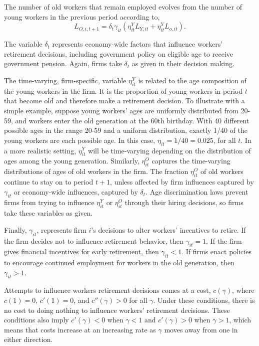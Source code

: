 \documentclass[11pt]{article}
\newcommand{\beq}{\begin{equation}}
\newcommand{\eeq}{\end{equation}}
\begin{document}
The number of old workers that remain employed evolves from the number of young workers in the previous period according to,
\beq \label{eq:gen} L_{O,i,t+1} = \delta_t \gamma_{it} \left( \eta^Y_{it}  L_{Y,it} + \eta^Y_{it} L_{o,it} \right). \eeq

The variable $\delta_t$ represents economy-wide factors that influence workers' retirement decisions, including government policy on eligible age to receive government pension. Again, firms take $\delta_t$ as given in their decision making.

The time-varying, firm-specific, variable $\eta^Y_{it}$ is related to the age composition of the young workers in the firm. It is the proportion of young workers in period $t$ that become old and therefore make a retirement decision. To illustrate with a simple example, suppose young workers' ages are uniformly distributed from 20-59, and workers enter the old generation at the 60th birthday. With 40 different possible ages in the range 20-59 and a uniform distribution, exactly 1/40 of the young workers are each possible age. In this case, $\eta_{it} = 1 / 40 = 0.025$, for all $t$. In a more realistic setting, $\eta_{it}^Y$ will be time-varying depending on the distribution of ages among the young generation. Similarly, $\eta_{it}^O$ captures the time-varying distributions of ages of old workers in the firm. The fraction $\eta_{it}^O$ of old workers continue to stay on to period $t+1$, unless affected by firm influences captured by $\gamma_{it}$ or economy-wide influences, captured by $\delta_{t}$. Age discrimination laws prevent firms from trying to influence $\eta^Y_{it}$ or $\eta^O_{it}$ through their hiring decisions, so firms take these variables as given.

Finally, $\gamma_{it}$, represents firm $i$'s decisions to alter workers' incentives to retire. If the firm decides not to influence retirement behavior, then $\gamma_{it}=1$. If the firm gives financial incentives for early retirement, then $\gamma_{it}<1$. If firms enact policies to encourage continued employment for workers in the old generation, then $\gamma_{it}>1$.

Attempts to influence workers retirement decisions comes at a cost, $c(\gamma)$, where $c(1)=0$, $c'(1)=0$, and $c''(\gamma)>0$ for all $\gamma$. Under these conditions, there is no cost to doing nothing to influence workers' retirement decisions. These conditions also imply $c'(\gamma)<0$ when $\gamma<1$ and $c'(\gamma)>0$ when $\gamma>1$, which means that costs increase at an increasing rate as $\gamma$ moves away from one in either direction.
\end{document}
